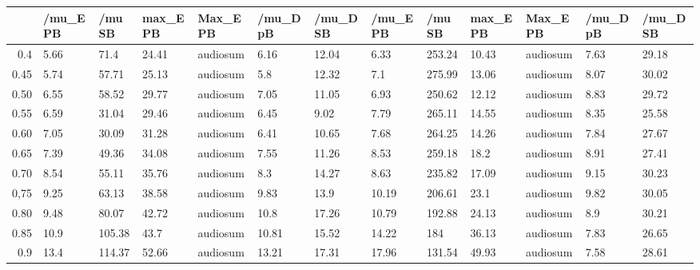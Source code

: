 \begin{table}[ht]
\centering
\begin{tabular}{rllllllllllll}
  \hline
 & /mu\_E PB & /mu SB & max\_E PB & Max\_E PB & /mu\_D pB & /mu\_D SB & /mu\_E PB & /mu SB & max\_E PB & Max\_E PB & /mu\_D pB & /mu\_D SB \\ 
  \hline
0.4 & 5.66 & 71.4 & 24.41 & audiosum & 6.16 & 12.04 & 6.33 & 253.24 & 10.43 & audiosum & 7.63 & 29.18 \\ 
  0.45 & 5.74 & 57.71 & 25.13 & audiosum & 5.8 & 12.32 & 7.1 & 275.99 & 13.06 & audiosum & 8.07 & 30.02 \\ 
  0.50 & 6.55 & 58.52 & 29.77 & audiosum & 7.05 & 11.05 & 6.93 & 250.62 & 12.12 & audiosum & 8.83 & 29.72 \\ 
  0.55 & 6.59 & 31.04 & 29.46 & audiosum & 6.45 & 9.02 & 7.79 & 265.11 & 14.55 & audiosum & 8.35 & 25.58 \\ 
  0.60 & 7.05 & 30.09 & 31.28 & audiosum & 6.41 & 10.65 & 7.68 & 264.25 & 14.26 & audiosum & 7.84 & 27.67 \\ 
  0.65 & 7.39 & 49.36 & 34.08 & audiosum & 7.55 & 11.26 & 8.53 & 259.18 & 18.2 & audiosum & 8.91 & 27.41 \\ 
  0.70 & 8.54 & 55.11 & 35.76 & audiosum & 8.3 & 14.27 & 8.63 & 235.82 & 17.09 & audiosum & 9.15 & 30.23 \\ 
  0,75 & 9.25 & 63.13 & 38.58 & audiosum & 9.83 & 13.9 & 10.19 & 206.61 & 23.1 & audiosum & 9.82 & 30.05 \\ 
  0.80 & 9.48 & 80.07 & 42.72 & audiosum & 10.8 & 17.26 & 10.79 & 192.88 & 24.13 & audiosum & 8.9 & 30.21 \\ 
  0.85 & 10.9 & 105.38 & 43.7 & audiosum & 10.81 & 15.52 & 14.22 & 184 & 36.13 & audiosum & 7.83 & 26.65 \\ 
  0.9 & 13.4 & 114.37 & 52.66 & audiosum & 13.21 & 17.31 & 17.96 & 131.54 & 49.93 & audiosum & 7.58 & 28.61 \\ 
   \hline
\end{tabular}
\end{table}
